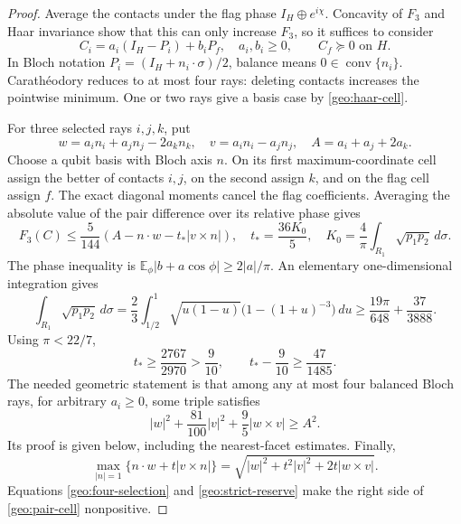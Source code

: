 \begin{proof}
Average the contacts under the flag phase
\(I_H\oplus e^{i\chi}\). Concavity of \(F_3\) and Haar invariance
show that this can only increase \(F_3\), so it suffices to consider
\[
 C_i=a_i(I_H-P_i)+b_iP_f,\quad a_i,b_i\ge0,\qquad
 C_f\succeq0\text{ on }H.
\]
In Bloch notation \(P_i=(I_H+n_i\cdot\sigma)/2\), balance means
\(0\in\operatorname{conv}\{n_i\}\). Carath\'eodory reduces to at most
four rays: deleting contacts increases the pointwise minimum.
One or two rays give a basis case by \eqref{geo:haar-cell}.

For three selected rays \(i,j,k\), put
\[
 w=a_in_i+a_jn_j-2a_kn_k,\quad
 v=a_in_i-a_jn_j,\quad A=a_i+a_j+2a_k.
\]
Choose a qubit basis with Bloch axis \(n\). On its first
maximum-coordinate cell assign the better of contacts \(i,j\), on
the second assign \(k\), and on the flag cell assign \(f\).
The exact diagonal moments cancel the flag coefficients. Averaging
the absolute value of the pair difference over its relative phase
gives
\begin{equation}
 F_3(C)\le\frac5{144}
 \left(A-n\cdot w-t_*|v\times n|\right),
 \quad
 t_*=\frac{36K_0}{5},\quad
 K_0=\frac4\pi\int_{R_1}\sqrt{p_1p_2}\,d\sigma.
 \label{geo:pair-cell}
\end{equation}
The phase inequality is
\(\mathbb E_\phi|b+a\cos\phi|\ge2|a|/\pi\).
An elementary one-dimensional integration gives
\[
 \int_{R_1}\sqrt{p_1p_2}\,d\sigma
 =\frac23\int_{1/2}^1\sqrt{u(1-u)}
                       \bigl(1-(1+u)^{-3}\bigr)\,du
 \ge\frac{19\pi}{648}+\frac{37}{3888}.
\]
Using \(\pi<22/7\),
\begin{equation}
 t_*\ge\frac{2767}{2970}>\frac9{10},
 \qquad t_*-\frac9{10}\ge\frac{47}{1485}.
 \label{geo:strict-reserve}
\end{equation}
The needed geometric statement is that among any at most four
balanced Bloch rays, for arbitrary \(a_i\ge0\), some triple satisfies
\begin{equation}
 |w|^2+\frac{81}{100}|v|^2+
             \frac95|w\times v|\ge A^2.
 \label{geo:four-selection}
\end{equation}
Its proof is given below, including the nearest-facet estimates.
Finally,
\[
 \max_{|n|=1}\{n\cdot w+t|v\times n|\}
 =\sqrt{|w|^2+t^2|v|^2+2t|w\times v|}.
\]
Equations \eqref{geo:four-selection} and \eqref{geo:strict-reserve}
make the right side of \eqref{geo:pair-cell} nonpositive.
\end{proof}


